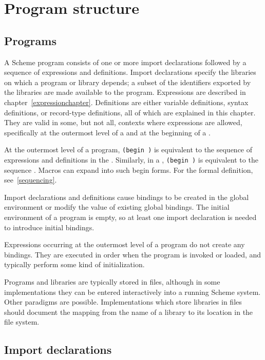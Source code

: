 \chapter{Program structure}
\label{programchapter}

\section{Programs}

A Scheme program consists of  
one or more import declarations followed by a sequence of
expressions and definitions.
Import declarations specify the libraries on which a program or library depends;
a subset of the identifiers exported by the libraries are made available to
the program.
Expressions are described in chapter~\ref{expressionchapter}.
Definitions are either variable definitions, syntax definitions, or
record-type definitions, all of which are explained in this chapter.
They are valid in some, but not all, contexts where expressions
are allowed, specifically at the outermost level of a 
and at the beginning of a .

At the outermost level of a program, {\tt(begin  \dotsfoo)} is
equivalent to the sequence of expressions and definitions
in the .   
Similarly, in a , {\tt(begin  \dotsfoo)} is equivalent
to the sequence  \dotsfoo.
Macros can expand into such {\cf begin} forms.
For the formal definition, see~\ref{sequencing}.

Import declarations and definitions
cause bindings to be created in the global
environment or modify the value of existing global bindings.
The initial environment of a program is empty,
so at least one import declaration is needed to introduce initial bindings.

Expressions occurring at the outermost level of a program
do not create any bindings.  They are
executed in order when the program is
invoked or loaded, and typically perform some kind of initialization.


Programs and libraries are typically stored in files, although
in some implementations they can be entered interactively into a running
Scheme system.  Other paradigms are possible.
Implementations which store libraries in files should document the
mapping from the name of a library to its location in the file system.

\section{Import declarations}


